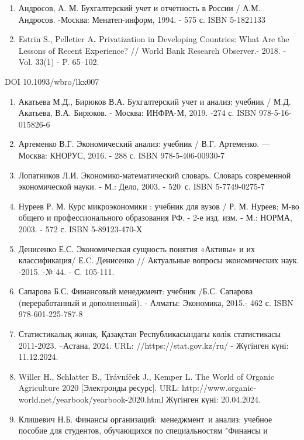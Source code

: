 {\begin{enumerate}
\def\labelenumi{\arabic{enumi}.}
\item
  Андросов, А. М. Бухгалтерский учет и отчетность в России / А.М.
  Андросов. -Москва: Менатеп-информ, 1994. - 575 с. ISBN 5-1821133
\item
  Estrin S., Pelletier A{\bfseries .} Privatization in Developing
  Countries: What Are the Lessons of Recent Experience? // World Bank
  Research Observer.- 2018. -Vol. 33(1) - P. 65--102.
\end{enumerate}

DOI 10.1093/wbro/lkx007

\begin{enumerate}
\def\labelenumi{\arabic{enumi}.}
\setcounter{enumi}{2}
\item
  Акатьева М.Д., Бирюков В.А. Бухгалтерский учет и анализ: учебник /
  М.Д. Акатьева, В.А. Бирюков. - Москва: ИНФРА-М, 2019. -274 с. ISBN
  978-5-16-015826-6
\item
  Артеменко В.Г. Экономический анализ: учебник / В.Г. Артеменко. ---
  Москва: КНОРУС, 2016. - 288 с. ISBN 978-5-406-00930-7
\item
  Лопатников Л.И. Экономико-математический словарь. Словарь современной
  экономической науки. - М.: Дело, 2003. - 520~с. ISBN 5-7749-0275-7
\item
  Нуреев Р. М. Курс микроэкономики : учебник для вузов / Р. М. Нуреев;
  М-во общего и профессионального образования РФ. - 2-е изд. изм. - М.:
  НОРМА, 2003. - 572 с. ISBN 5-89123-470-Х
\item
  Денисенко Е.С. Экономическая сущность понятия «Активы» и их
  классификация/ Е.C. Денисенко // Актуальные вопросы экономических
  наук. -2015. -№ 44. - С. 105-111.
\item
  Сапарова Б.С. Финансовый менеджмент: учебник /Б.С. Сапарова
  (переработанный и дополненный). - Алматы: Экономика, 2015.- 462 с.
  ISBN 978-601-225-787-8
\item
  Статистикалық жинақ. Қазақстан Республикасындағы көлік статистикасы
  2011-2023. --Астана, 2024. URL: //https://stat.gov.kz/ru/ - Жүгінген
  күні: 11.12.2024.
\item
  Willer H., Schlatter B., Trávníček J., Kemper L. The World of Organic
  Agriculture 2020 {[}Электронды ресурс{]}. URL:
  http://www.organic-world.net/yearbook/yearbook-2020.html Жүгінген
  күні: 20.04.2024.
\item
  Клишевич Н.Б. Финансы организаций:~менеджмент~и анализ: учебное
  пособие для студентов, обучающихся по специальностям "Финансы и

\end{enumerate}}
